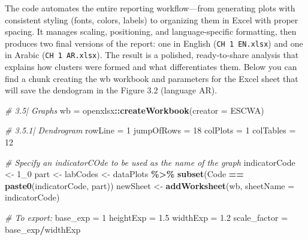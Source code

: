\documentclass[
]{article}
\newenvironment{Shaded}{\begin{snugshade}}{\end{snugshade}}
\newcommand{\AttributeTok}[1]{\textcolor[rgb]{0.13,0.29,0.53}{#1}}
\newcommand{\CommentTok}[1]{\textcolor[rgb]{0.56,0.35,0.01}{\textit{#1}}}
\newcommand{\DecValTok}[1]{\textcolor[rgb]{0.00,0.00,0.81}{#1}}
\newcommand{\FloatTok}[1]{\textcolor[rgb]{0.00,0.00,0.81}{#1}}
\newcommand{\FunctionTok}[1]{\textcolor[rgb]{0.13,0.29,0.53}{\textbf{#1}}}
\newcommand{\NormalTok}[1]{#1}
\newcommand{\OtherTok}[1]{\textcolor[rgb]{0.56,0.35,0.01}{#1}}
\newcommand{\SpecialCharTok}[1]{\textcolor[rgb]{0.81,0.36,0.00}{\textbf{#1}}}
\newcommand{\StringTok}[1]{\textcolor[rgb]{0.31,0.60,0.02}{#1}}
\begin{document}
The code automates the entire reporting workflow---from generating plots
with consistent styling (fonts, colors, labels) to organizing them in
Excel with proper spacing. It manages scaling, positioning, and
language-specific formatting, then produces two final versions of the
report: one in English (\texttt{CH\ 1\ EN.xlsx}) and one in Arabic
(\texttt{CH\ 1\ AR.xlsx}). The result is a polished, ready-to-share
analysis that explains how clusters were formed and what differentiates
them. Below you can find a chunk creating the wb workbook and parameters
for the Excel sheet that will save the dendogram in the Figure 3.2
(language AR).

\begin{Shaded}
\begin{Highlighting}[]

\CommentTok{\# 3.5| Graphs}
\NormalTok{wb }\OtherTok{=}\NormalTok{ openxlsx}\SpecialCharTok{::}\FunctionTok{createWorkbook}\NormalTok{(}\AttributeTok{creator =} \StringTok{\textquotesingle{}ESCWA\textquotesingle{}}\NormalTok{)}

\CommentTok{\# 3.5.1| Dendrogram }
\NormalTok{rowLine }\OtherTok{=} \DecValTok{1}
\NormalTok{jumpOfRows }\OtherTok{=} \DecValTok{18}
\NormalTok{colPlots }\OtherTok{=} \DecValTok{1}
\NormalTok{colTables }\OtherTok{=} \DecValTok{12}

\CommentTok{\# Specify an indicatorCOde to be used as the name of the graph}
\NormalTok{indicatorCode }\OtherTok{\textless{}{-}} \StringTok{\textquotesingle{}1\_0\textquotesingle{}}
\NormalTok{part }\OtherTok{\textless{}{-}} \StringTok{\textquotesingle{}\textquotesingle{}}
\NormalTok{labCodes }\OtherTok{\textless{}{-}}\NormalTok{ dataPlots }\SpecialCharTok{\%\textgreater{}\%} \FunctionTok{subset}\NormalTok{(Code }\SpecialCharTok{==} \FunctionTok{paste0}\NormalTok{(indicatorCode, part))}
\NormalTok{newSheet }\OtherTok{\textless{}{-}} \FunctionTok{addWorksheet}\NormalTok{(wb, }\AttributeTok{sheetName =}\NormalTok{ indicatorCode)}


\CommentTok{\# To export:}
\NormalTok{base\_exp }\OtherTok{=} \DecValTok{1}
\NormalTok{heightExp }\OtherTok{=} \FloatTok{1.5}
\NormalTok{widthExp }\OtherTok{=} \FloatTok{1.2}
\NormalTok{scale\_factor }\OtherTok{=}\NormalTok{ base\_exp}\SpecialCharTok{/}\NormalTok{widthExp}


\end{Highlighting}
\end{Shaded}
\end{document}
